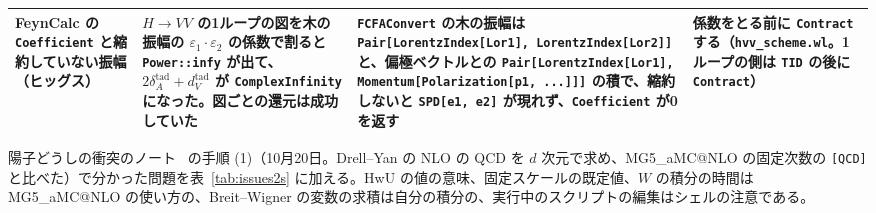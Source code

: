 \documentclass[a4paper,10pt]{ltjsarticle}
\makeatletter
\newcommand{\MGaMC}{MG5\_aMC@NLO}
\makeatother
\begin{document}
\begin{table}[tbp]
\begin{tabularx}{\linewidth}{>{\raggedright\arraybackslash}p{2.4cm}>{\raggedright\arraybackslash}X>{\raggedright\arraybackslash}X>{\raggedright\arraybackslash}X}
FeynCalc の \texttt{Coefficient} と縮約していない振幅（ヒッグス） & $H\to VV$ の1ループの図を木の振幅の $\varepsilon_1\cdot\varepsilon_2$ の係数で割ると \texttt{Power::infy} が出て、$2\delta_A^{\mathrm{tad}}+d_V^{\mathrm{tad}}$ が \texttt{ComplexInfinity} になった。図ごとの還元は成功していた & \texttt{FCFAConvert} の木の振幅は \texttt{Pair[LorentzIndex[Lor1], LorentzIndex[Lor2]]} と、偏極ベクトルとの \texttt{Pair[LorentzIndex[Lor1], Momentum[Polarization[p1, ...]]]} の積で、縮約しないと \texttt{SPD[e1, e2]} が現れず、\texttt{Coefficient} が0を返す & 係数をとる前に \texttt{Contract} する（\texttt{hvv\_scheme.wl}。1ループの側は \texttt{TID} の後に \texttt{Contract}） \\
\bottomrule
\end{tabularx}
\end{table}

陽子どうしの衝突のノート~\cite{ppnote} の手順 (1)（10月20日。Drell--Yan の NLO の QCD を $d$ 次元で求め、\MGaMC{} の固定次数の \texttt{[QCD]} と比べた）で分かった問題を表~\ref{tab:issues2s} に加える。HwU の値の意味、固定スケールの既定値、$W$ の積分の時間は \MGaMC{} の使い方の、Breit--Wigner の変数の求積は自分の積分の、実行中のスクリプトの編集はシェルの注意である。
\end{document}
